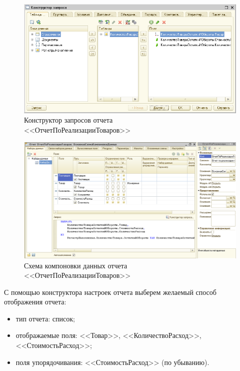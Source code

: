 \begin{figure}[h!]
  \centering
  \includegraphics[width=150mm]{pic/report_output_query}
  \caption{Конструктор запросов отчета \\ <<ОтчетПоРеализацииТоваров>>}
  \label{fig:report_output_query}
\end{figure}

\begin{figure}[h!]
  \centering
  \includegraphics[width=150mm]{pic/report_output_scheme}
  \caption{Схема компоновки данных отчета \\ <<ОтчетПоРеализацииТоваров>>}
  \label{fig:report_output_scheme}
\end{figure}

С помощью конструктора настроек отчета выберем желаемый способ отображения
отчета:
\begin{itemize}
\item тип отчета: список;
\item отображаемые поля: <<Товар>>,
  <<КоличествоРасход>>, <<СтоимостьРасход>>;
\item поля упорядочивания:
  <<СтоимостьРасход>> (по убыванию).
\end{itemize}

